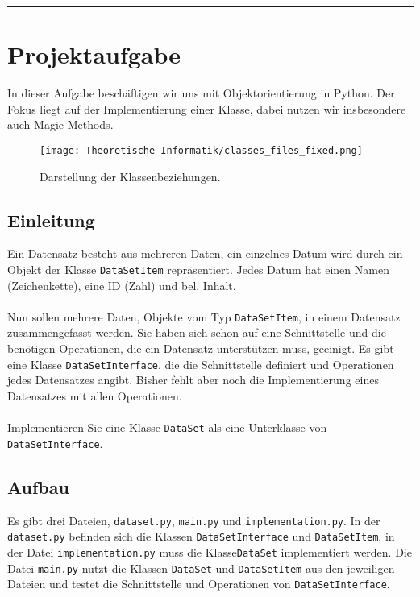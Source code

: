 \documentclass[a4paper]{article}
\author{mika.reetz }
\date{October 2024}
\begin{document}
\tableofcontents
\hfill
\hrule

\section{Projektaufgabe}

In dieser Aufgabe beschäftigen wir uns mit Objektorientierung in Python.
Der Fokus liegt auf der Implementierung einer Klasse, dabei nutzen wir insbesondere auch Magic Methods.\\

\begin{figure}[h]
    \centering
    \texttt{[image: Theoretische Informatik/classes\_files\_fixed.png]}
    \caption{Darstellung der Klassenbeziehungen.}
    \label{fig:enter-label}
\end{figure}


\subsection{Einleitung}
Ein Datensatz besteht aus mehreren Daten, ein einzelnes Datum wird durch ein Objekt der Klasse \texttt{DataSetItem} repräsentiert.
Jedes Datum hat einen Namen (Zeichenkette), eine ID (Zahl) und bel. Inhalt.\\
\\
Nun sollen mehrere Daten, Objekte vom Typ \texttt{DataSetItem}, in einem Datensatz zusammengefasst werden.
Sie haben sich schon auf eine Schnittstelle und die benötigen Operationen, die ein Datensatz unterstützen muss, geeinigt.
Es gibt eine Klasse \texttt{DataSetInterface}, die die Schnittstelle definiert und Operationen jedes Datensatzes angibt.
Bisher fehlt aber noch die Implementierung eines Datensatzes mit allen Operationen.\\
\\
Implementieren Sie eine Klasse \texttt{DataSet} als eine Unterklasse von \texttt{DataSetInterface}.


\subsection{Aufbau}

Es gibt drei Dateien, \texttt{dataset.py}, \texttt{main.py} und \texttt{implementation.py}.
In der \texttt{dataset.py} befinden sich die Klassen \texttt{DataSetInterface} und \texttt{DataSetItem},
in der Datei \texttt{implementation.py} muss die Klasse\newpage \texttt{DataSet} implementiert werden.
Die Datei \texttt{main.py} nutzt die Klassen \texttt{DataSet} und \texttt{DataSetItem} aus den jeweiligen Dateien und testet die Schnittstelle und Operationen von \texttt{DataSetInterface}.\\
\end{document}
